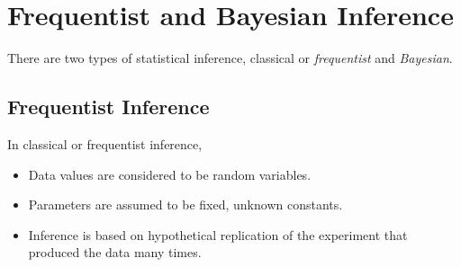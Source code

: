\section{Frequentist and Bayesian Inference}
There are two types of statistical inference, classical or \textit{frequentist} and \textit{Bayesian}.
\par\vspace{0.5 cm}
\subsection{Frequentist Inference}
In classical or frequentist inference, 
\par\vspace{0.5 cm}
\begin{itemize}
\item Data values are considered to be random variables.
\item Parameters are assumed to be fixed, unknown constants.
\item Inference is based on hypothetical replication of the experiment that produced the data many times.
\end{itemize}
\par\vspace{0.5 cm}
